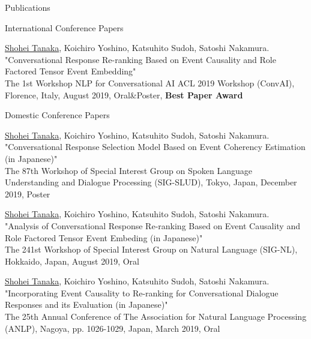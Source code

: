 \documentclass{resume} %
\begin{document}

\begin{rSection}{Publications}

\begin{rSubsection}{International Conference Papers}{}{}{}
\item \underline{Shohei Tanaka}, Koichiro Yoshino, Katsuhito Sudoh, Satoshi Nakamura.
\\"Conversational Response Re-ranking Based on Event Causality and Role Factored Tensor Event Embedding"
\\The 1st Workshop NLP for Conversational AI ACL 2019 Workshop (ConvAI), Florence, Italy, August 2019, Oral\&Poster, {\bf Best Paper Award}
\end{rSubsection}

\newpage

\begin{rSubsection}{Domestic Conference Papers}{}{}{}
\item \underline{Shohei Tanaka}, Koichiro Yoshino, Katsuhito Sudoh, Satoshi Nakamura.
\\"Conversational Response Selection Model Based on Event Coherency Estimation (in Japanese)"
\\The 87th Workshop of Special Interest Group on Spoken Language Understanding and Dialogue Processing (SIG-SLUD), Tokyo, Japan, December 2019, Poster

\item \underline{Shohei Tanaka}, Koichiro Yoshino, Katsuhito Sudoh, Satoshi Nakamura.
\\"Analysis of Conversational Response Re-ranking Based on Event Causality and Role Factored Tensor Event Embeding (in Japanese)"
\\The 241st Workshop of Special Interest Group on Natural Language (SIG-NL), Hokkaido, Japan, August 2019, Oral

\item \underline{Shohei Tanaka}, Koichiro Yoshino, Katsuhito Sudoh, Satoshi Nakamura.
\\"Incorporating Event Causality to Re-ranking for Conversational Dialogue Responses and its Evaluation (in Japanese)"
\\The 25th Annual Conference of The Association for Natural Language Processing (ANLP), Nagoya, pp. 1026-1029, Japan, March 2019, Oral


\end{rSubsection}
\end{rSection}
\end{document}
